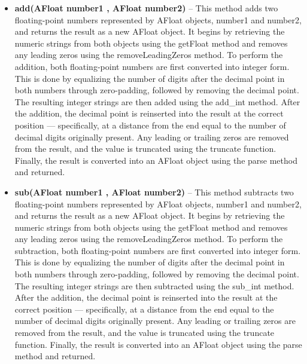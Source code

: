 \documentclass[a4paper,12pt]{article}
\begin{document}
{\begin{itemize}
    \item \textbf{add(AFloat number1 , AFloat number2)} -- This method adds two floating-point numbers represented by AFloat objects, number1 and number2, and returns the result as a new AFloat object. It begins by retrieving the numeric strings from both objects using the getFloat method and removes any leading zeros using the removeLeadingZeros method. To perform the addition, both floating-point numbers are first converted into integer form. This is done by equalizing the number of digits after the decimal point in both numbers through zero-padding, followed by removing the decimal point. The resulting integer strings are then added using the add\_int method. After the addition, the decimal point is reinserted into the result at the correct position — specifically, at a distance from the end equal to the number of decimal digits originally present. Any leading or trailing zeros are removed from the result, and the value is truncated using the truncate function. Finally, the result is converted into an AFloat object using the parse method and returned.\\

    \item \textbf{sub(AFloat number1 , AFloat number2)} -- This method subtracts two floating-point numbers represented by AFloat objects, number1 and number2, and returns the result as a new AFloat object. It begins by retrieving the numeric strings from both objects using the getFloat method and removes any leading zeros using the removeLeadingZeros method. To perform the subtraction, both floating-point numbers are first converted into integer form. This is done by equalizing the number of digits after the decimal point in both numbers through zero-padding, followed by removing the decimal point. The resulting integer strings are then subtracted using the sub\_int method. After the addition, the decimal point is reinserted into the result at the correct position — specifically, at a distance from the end equal to the number of decimal digits originally present. Any leading or trailing zeros are removed from the result, and the value is truncated using the truncate function. Finally, the result is converted into an AFloat object using the parse method and returned.\\


\end{itemize}}
\end{document}
